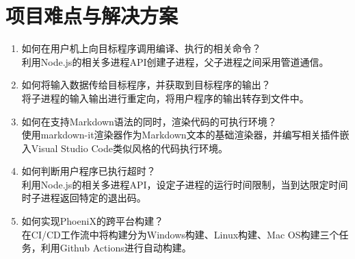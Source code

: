 \section{项目难点与解决方案}

\begin{enumerate}
    \item 如何在用户机上向目标程序调用编译、执行的相关命令？\\
          利用Node.js的相关多进程API创建子进程，父子进程之间采用管道通信。
    \item 如何将输入数据传给目标程序，并获取到目标程序的输出？\\
          将子进程的输入输出进行重定向，将用户程序的输出转存到文件中。
    \item 如何在支持Markdown语法的同时，渲染代码的可执行环境？\\
          使用markdown-it渲染器作为Markdown文本的基础渲染器，并编写相关插件嵌入Visual Studio Code类似风格的代码执行环境。
    \item 如何判断用户程序已执行超时？\\
          利用Node.js的相关多进程API，设定子进程的运行时间限制，当到达限定时间时子进程返回特定的退出码。
    \item 如何实现PhoeniX的跨平台构建？\\
          在CI/CD工作流中将构建分为Windows构建、Linux构建、Mac OS构建三个任务，利用Github Actions进行自动构建。
\end{enumerate}